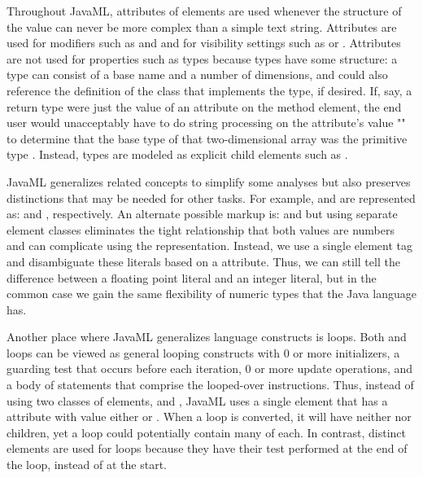\documentclass{article}
\begin{document}
Throughout JavaML, attributes of elements are used whenever the
structure of the value can never be more complex than a simple text string.
Attributes are used for modifiers such as  and
 and for visibility settings such as
 or .  Attributes are not used
for properties such as types because types have some structure: a type
can consist of a base name and a number of dimensions, and could also
reference the definition of the class that implements the type, if
desired.  If, say, a return type were just the value of an attribute on
the method element, the end user would unacceptably have to do string
processing on the attribute's value "" to determine that the base
type of that two-dimensional array was the primitive type
.  Instead, types are modeled as explicit
child elements such as .

JavaML generalizes related concepts to simplify some analyses
but also preserves distinctions that may be needed for other tasks.
For example,  and  are represented as:
 and
,
respectively.  An alternate possible markup is:
 and
 but using separate
element classes eliminates the tight relationship that both values are
numbers and can complicate using the representation.  Instead, we use
a single element tag and 
disambiguate these literals based on a  attribute. Thus,
we can still
tell the difference between a floating point literal and an integer
literal, but in the common case we gain the same flexibility of numeric
types that the Java language has.

Another place where JavaML generalizes language constructs is loops.  
Both  and  loops
can be viewed as general looping constructs with 0 or more initializers,
a guarding test that occurs before each iteration, 0 or more update
operations, and a body of statements that comprise the looped-over
instructions.  Thus, instead of using two classes of elements,
 and , JavaML uses a single
 element that has a  attribute with
value either  or .  When a
 loop is converted, it will have neither  nor
 children, yet a  loop could potentially contain many
of each.  In contrast, distinct  elements are used for
 loops because they have their test performed at the end of the
loop, instead of at the start.
\end{document}

